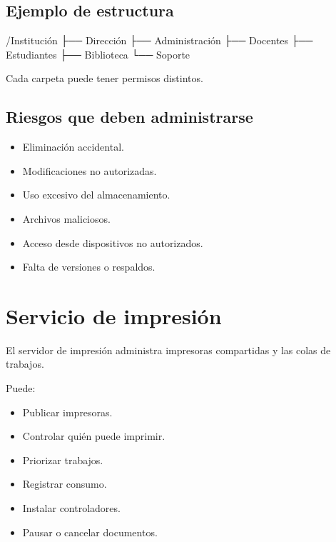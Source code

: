 \documentclass[
  spanish,
  letterpaper,
]{scrbook}
\newenvironment{Shaded}{\begin{snugshade}}{\end{snugshade}}
\newcommand{\NormalTok}[1]{\textcolor[rgb]{0.00,0.23,0.31}{#1}}
\providecommand{\tightlist}{%
  \setlength{\itemsep}{0pt}\setlength{\parskip}{0pt}}
\begin{document}
\section{Ejemplo de estructura}\label{ejemplo-de-estructura}

\begin{Shaded}
\begin{Highlighting}[]
\NormalTok{/Institución}
\NormalTok{├── Dirección}
\NormalTok{├── Administración}
\NormalTok{├── Docentes}
\NormalTok{├── Estudiantes}
\NormalTok{├── Biblioteca}
\NormalTok{└── Soporte}
\end{Highlighting}
\end{Shaded}

Cada carpeta puede tener permisos distintos.

\section{Riesgos que deben
administrarse}\label{riesgos-que-deben-administrarse}

\begin{itemize}
\tightlist
\item
  Eliminación accidental.
\item
  Modificaciones no autorizadas.
\item
  Uso excesivo del almacenamiento.
\item
  Archivos maliciosos.
\item
  Acceso desde dispositivos no autorizados.
\item
  Falta de versiones o respaldos.
\end{itemize}


\chapter{Servicio de impresión}\label{servicio-de-impresiuxf3n}

El servidor de impresión administra impresoras compartidas y las colas
de trabajos.

Puede:

\begin{itemize}
\tightlist
\item
  Publicar impresoras.
\item
  Controlar quién puede imprimir.
\item
  Priorizar trabajos.
\item
  Registrar consumo.
\item
  Instalar controladores.
\item
  Pausar o cancelar documentos.
\end{itemize}
\end{document}
